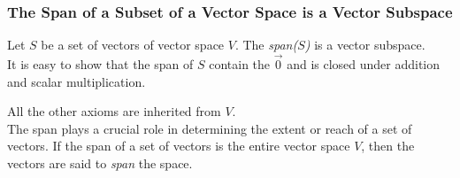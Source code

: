 \subsubsection{The Span of a Subset of a Vector Space is a Vector Subspace}

Let $S$ be a set of vectors of vector space $V$. The {\textit{span($S$)}} is a vector subspace.
\\

It is easy to show that the span of $S$ contain the $\vec 0$ and is closed under addition and scalar multiplication.

All the other axioms are inherited from $V$.
\\

The span plays a crucial role in determining the extent or reach of a set of vectors. If the span of a set of vectors is the entire vector space $V$, then the vectors are said to \emph{span} the space.